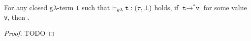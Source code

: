 \begin{lemma}
	For any closed g$\lambda$-term \texttt{t} such that
	$\vdash_{g\lambda} \texttt{t} : (\tau, \bot)$ holds, 
	if	$\texttt{t} \rightarrow^{\ast} \texttt{v}$ for some value \texttt{v}, then
	 . 
\end{lemma}
\begin{proof}
\hspace*{5cm}TODO
\end{proof}
